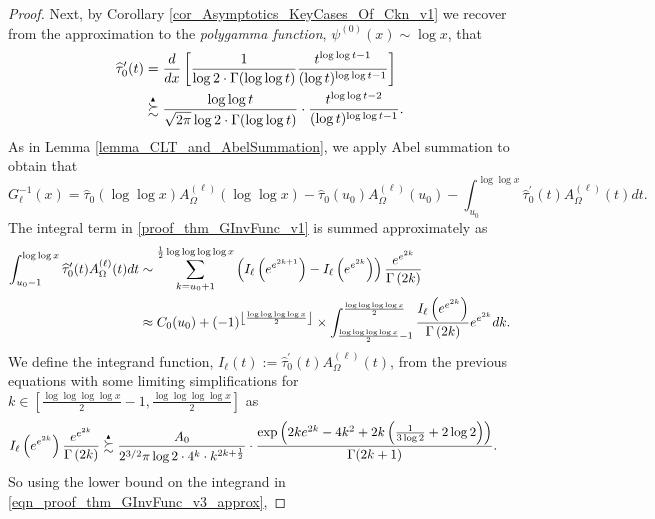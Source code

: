 \documentclass[11pt,reqno,a4letter]{article}
\numberwithin{figure}{section}
\numberwithin{table}{section}
\newcommand{\Floor}[2]{\ensuremath{\left\lfloor \frac{#1}{#2} \right\rfloor}}
\theoremstyle{plain}
\numberwithin{theorem}{section}
\theoremstyle{definition}
\newcommand{\SuccSim}[0]{\overset{_{\scriptsize{\blacktriangle}}}{\succsim}}
\begin{document}
\begin{proof}
Next, by Corollary \ref{cor_Asymptotics_KeyCases_Of_Ckn_v1} 
we recover from the approximation to the 
\emph{polygamma function}, $\psi^{(0)}(x) \sim \log x$, that 
\begin{align*} 
\widehat{\tau}_0^{\prime}(t) & = \frac{d}{dx}\left[ 
     \frac{1}{\log 2 \cdot \Gamma(\log\log t)} \frac{t^{\log\log t - 1}}{(\log t)^{\log\log t-1}} 
     \right] \\ 
     & \SuccSim 
     \frac{\log\log t}{\sqrt{2\pi} \log 2 \cdot \Gamma(\log\log t)} \cdot 
     \frac{t^{\log\log t-2}}{(\log t)^{\log\log t-1}}. 
\end{align*} 
As in Lemma \ref{lemma_CLT_and_AbelSummation}, we apply Abel summation to obtain that  
\begin{equation} 
\label{proof_thm_GInvFunc_v1} 
G_{\ell}^{-1}(x) = \widehat{\tau}_0(\log\log x) A_{\Omega}^{(\ell)}(\log\log x) - 
     \widehat{\tau}_0(u_0) A_{\Omega}^{(\ell)}(u_0) - \int_{u_0}^{\log\log x} 
     \widehat{\tau}_0^{\prime}(t) A_{\Omega}^{(\ell)}(t) dt. 
\end{equation} 
The integral term in \eqref{proof_thm_GInvFunc_v1} is summed approximately as 
\begin{align} 
\label{eqn_proof_thm_GInvFunc_v3_approx} 
\int_{u_0-1}^{\log\log x} \widehat{\tau}_0^{\prime}(t) A_{\Omega}^{(\ell)}(t) dt & \sim 
     \sum_{k=u_0+1}^{\frac{1}{2}\log\log\log\log x} \left( 
     I_{\ell}\left(e^{e^{2k+1}}\right) - 
     I_{\ell}\left(e^{e^{2k}}\right) 
     \right) \frac{e^{e^{2k}}}{\Gamma\left(2k\right)} \\ 
\notag 
     & \approx 
     C_0(u_0) + 
     (-1)^{\Floor{\log\log\log\log x}{2}} \times 
     \int_{\frac{\log\log\log\log x}{2}-1}^{\frac{\log\log\log\log x}{2}} 
     \frac{I_{\ell}\left(e^{e^{2k}}\right)}{\Gamma\left(2k\right)} 
     e^{e^{2k}} dk. 
\end{align} 
We define the integrand function, 
$I_{\ell}(t) := \widehat{\tau}_0^{\prime}(t) A_{\Omega}^{(\ell)}(t)$, 
from the previous equations with some limiting simplifications for 
$k \in \left[\frac{\log\log\log\log x}{2}-1, \frac{\log\log\log\log x}{2}\right]$ as 
\begin{align} 
\label{eqn_proof_thm_GInvFunc_v3_approx} 
I_{\ell}\left(e^{e^{2k}}\right) \frac{e^{e^{2k}}}{ 
     \Gamma\left(2k\right)} & \SuccSim \frac{A_0}{2^{3/2} \pi \log 2 \cdot 4^k \cdot k^{2k+\frac{1}{2}}} \cdot 
     \frac{\exp\left(2ke^{2k} -4k^2 + 2k\left(\frac{1}{3\log 2} + 2\log 2\right)\right)}{\Gamma(2k+1)}. 
\end{align} 
So using the lower bound on the integrand in \eqref{eqn_proof_thm_GInvFunc_v3_approx}, 

\end{proof}
\end{document}
